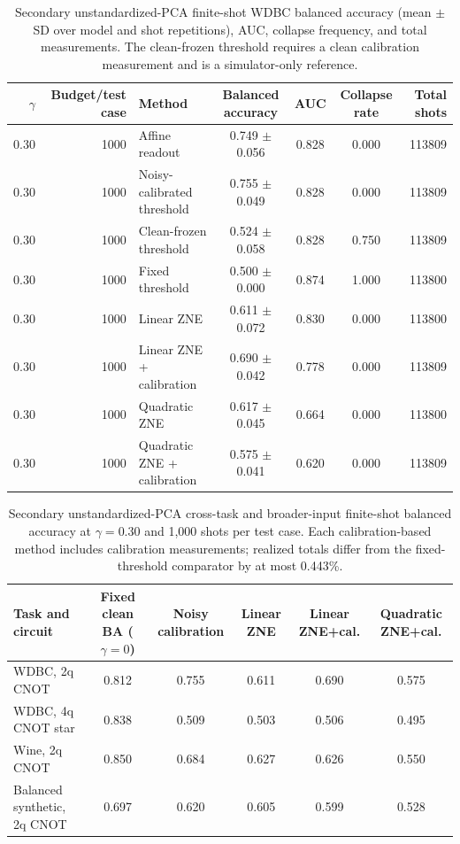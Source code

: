 \documentclass[10pt]{article}
\begin{document}
\begin{table}[t]
\centering
\caption{Secondary unstandardized-PCA finite-shot WDBC balanced accuracy (mean $\pm$ SD over model and shot repetitions), AUC, collapse frequency, and total measurements. The clean-frozen threshold requires a clean calibration measurement and is a simulator-only reference.}
\label{tab:finite}
\scriptsize
\begin{tabular}{@{}r r l c c c r@{}}
\toprule
$\gamma$ & Budget/test case & Method & Balanced accuracy & AUC & Collapse rate & Total shots \\
\midrule
0.30 & 1000 & Affine readout & 0.749 $\pm$ 0.056 & 0.828 & 0.000 & 113809 \\
0.30 & 1000 & Noisy-calibrated threshold & 0.755 $\pm$ 0.049 & 0.828 & 0.000 & 113809 \\
0.30 & 1000 & Clean-frozen threshold & 0.524 $\pm$ 0.058 & 0.828 & 0.750 & 113809 \\
0.30 & 1000 & Fixed threshold & 0.500 $\pm$ 0.000 & 0.874 & 1.000 & 113800 \\
0.30 & 1000 & Linear ZNE & 0.611 $\pm$ 0.072 & 0.830 & 0.000 & 113800 \\
0.30 & 1000 & Linear ZNE + calibration & 0.690 $\pm$ 0.042 & 0.778 & 0.000 & 113809 \\
0.30 & 1000 & Quadratic ZNE & 0.617 $\pm$ 0.045 & 0.664 & 0.000 & 113800 \\
0.30 & 1000 & Quadratic ZNE + calibration & 0.575 $\pm$ 0.041 & 0.620 & 0.000 & 113809 \\
\bottomrule
\end{tabular}
\end{table}

\begin{table}[t]
\centering
\caption{Secondary unstandardized-PCA cross-task and broader-input finite-shot balanced accuracy at $\gamma=0.30$ and 1,000 shots per test case. Each calibration-based method includes calibration measurements; realized totals differ from the fixed-threshold comparator by at most 0.443\%.}
\label{tab:transfer}
\begin{tabular}{@{}l c c c c c@{}}
\toprule
Task and circuit & Fixed clean BA ($\gamma=0$) & Noisy calibration & Linear ZNE & Linear ZNE+cal. & Quadratic ZNE+cal. \\
\midrule
WDBC, 2q CNOT & 0.812 & 0.755 & 0.611 & 0.690 & 0.575 \\
WDBC, 4q CNOT star & 0.838 & 0.509 & 0.503 & 0.506 & 0.495 \\
Wine, 2q CNOT & 0.850 & 0.684 & 0.627 & 0.626 & 0.550 \\
Balanced synthetic, 2q CNOT & 0.697 & 0.620 & 0.605 & 0.599 & 0.528 \\
\bottomrule
\end{tabular}
\end{table}
\end{document}
